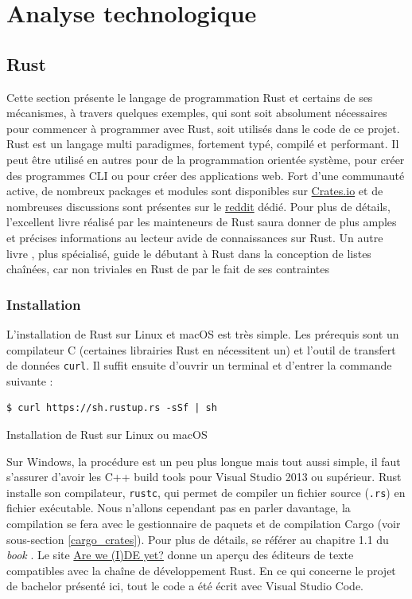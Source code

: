 \documentclass[a4paper, 12pt]{article}
\newenvironment{code}{\captionsetup{type=listing}}{}
\begin{document}
\section{Analyse technologique} %
\subsection{Rust}
Cette section présente le langage de programmation Rust et certains de ses mécanismes, à 
travers quelques exemples, qui sont soit absolument nécessaires pour commencer à programmer avec 
Rust, soit utilisés dans le code de ce projet. Rust est un langage multi paradigmes, fortement typé, 
compilé et performant. Il peut être utilisé en autres pour de la programmation orientée système, 
pour créer des programmes CLI ou pour créer des applications web. Fort d'une communauté active, de 
nombreux packages et modules sont disponibles sur \href{https://crates.io}{Crates.io} \cite{ref33} 
et de nombreuses discussions sont présentes sur le \href{https://www.reddit.com/r/rust/}{reddit} 
\cite{ref34} dédié. Pour plus de détails, l'excellent livre \cite{ref0} réalisé par les mainteneurs 
de Rust saura donner de plus amples et précises informations au lecteur avide de connaissances sur 
Rust. Un autre livre \cite{ref2}, plus spécialisé, guide le débutant à Rust dans la conception de 
listes chaînées, car non triviales en Rust de par le fait de ses contraintes

\subsubsection{Installation}
L'installation de Rust sur Linux et macOS est très simple. Les prérequis sont un 
compilateur C (certaines librairies Rust en nécessitent un) et l'outil de transfert de données 
\texttt{curl}. Il suffit ensuite d'ouvrir un terminal et d'entrer la commande suivante :
\bigbreak
\begin{code}
    \begin{verbatim}
$ curl https://sh.rustup.rs -sSf | sh
    \end{verbatim}
    \caption{Installation de Rust sur Linux ou macOS}
\end{code}
\bigbreak
Sur Windows, la procédure est un peu plus longue mais tout aussi simple, il faut s'assurer d'avoir 
les C++ build tools pour Visual Studio 2013 ou supérieur. Rust installe son compilateur, 
\texttt{rustc}, qui permet de compiler un fichier source (\texttt{.rs}) en 
fichier exécutable. Nous n'allons cependant pas en parler davantage, la compilation se fera avec 
le gestionnaire de paquets et de compilation Cargo (voir sous-section \ref{cargo_crates}).
Pour plus de détails, se référer au chapitre 1.1 du \textit{book} \cite{ref0}.
Le site \href{https://areweideyet.com/}{Are we (I)DE yet?} \cite{ref1} donne un aperçu des éditeurs 
de texte compatibles avec la chaîne de développement Rust. En ce qui concerne le projet de bachelor 
présenté ici, tout le code a été écrit avec Visual Studio Code.
\end{document}

